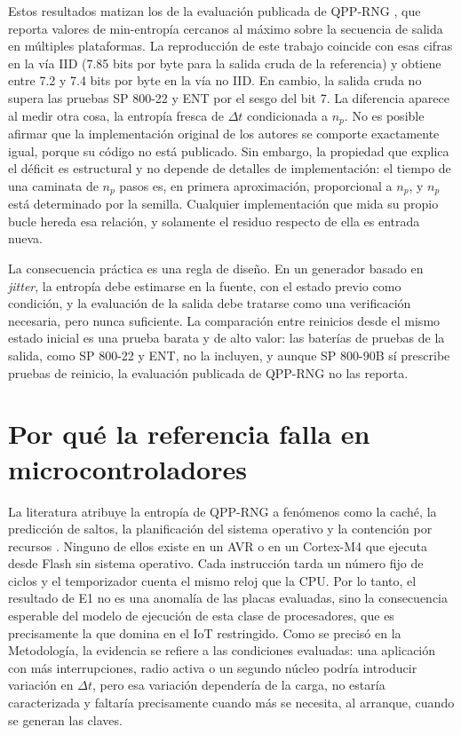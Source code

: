 Estos resultados matizan los de la evaluación publicada de QPP-RNG \cite{Vrana2025RawEvaluation}, que reporta valores de min-entropía cercanos al máximo sobre la secuencia de salida en múltiples plataformas. La reproducción de este trabajo coincide con esas cifras en la vía IID (7.85 bits por byte para la salida cruda de la referencia) y obtiene entre 7.2 y 7.4 bits por byte en la vía no IID. En cambio, la salida cruda no supera las pruebas SP 800-22 y ENT por el sesgo del bit 7. La diferencia aparece al medir otra cosa, la entropía fresca de $\Delta t$ condicionada a $n_p$. No es posible afirmar que la implementación original de los autores se comporte exactamente igual, porque su código no está publicado. Sin embargo, la propiedad que explica el déficit es estructural y no depende de detalles de implementación: el tiempo de una caminata de $n_p$ pasos es, en primera aproximación, proporcional a $n_p$, y $n_p$ está determinado por la semilla. Cualquier implementación que mida su propio bucle hereda esa relación, y solamente el residuo respecto de ella es entrada nueva.

La consecuencia práctica es una regla de diseño. En un generador basado en \textit{jitter}, la entropía debe estimarse en la fuente, con el estado previo como condición, y la evaluación de la salida debe tratarse como una verificación necesaria, pero nunca suficiente. La comparación entre reinicios desde el mismo estado inicial es una prueba barata y de alto valor: las baterías de pruebas de la salida, como SP 800-22 y ENT, no la incluyen, y aunque SP 800-90B sí prescribe pruebas de reinicio, la evaluación publicada de QPP-RNG no las reporta.

\section{Por qué la referencia falla en microcontroladores}

La literatura atribuye la entropía de QPP-RNG a fenómenos como la caché, la predicción de saltos, la planificación del sistema operativo y la contención por recursos \cite{Kuang2025IID-BasedJitter,Vrana2025RawEvaluation}. Ninguno de ellos existe en un AVR o en un Cortex-M4 que ejecuta desde Flash sin sistema operativo. Cada instrucción tarda un número fijo de ciclos y el temporizador cuenta el mismo reloj que la CPU. Por lo tanto, el resultado de E1 no es una anomalía de las placas evaluadas, sino la consecuencia esperable del modelo de ejecución de esta clase de procesadores, que es precisamente la que domina en el IoT restringido. Como se precisó en la Metodología, la evidencia se refiere a las condiciones evaluadas: una aplicación con más interrupciones, radio activa o un segundo núcleo podría introducir variación en $\Delta t$, pero esa variación dependería de la carga, no estaría caracterizada y faltaría precisamente cuando más se necesita, al arranque, cuando se generan las claves.

